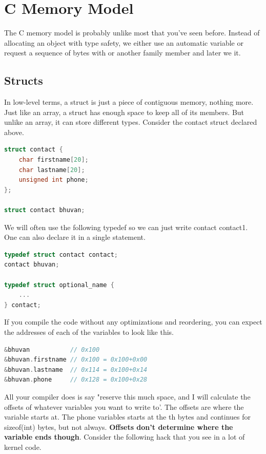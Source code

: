 \section{C Memory Model}

The C memory model is probably unlike most that you've seen before. Instead of allocating an object with type safety, we either use an automatic variable or request a sequence of bytes with  or another family member and later we  it.

\subsection{Structs}

In low-level terms, a struct is just a piece of contiguous memory, nothing more.
Just like an array, a struct has enough space to keep all of its members.
But unlike an array, it can store different types. Consider the contact struct declared above.

\begin{lstlisting}[language=C]
struct contact {
    char firstname[20];
    char lastname[20];
    unsigned int phone;
};

struct contact bhuvan;
\end{lstlisting}

We will often use the following typedef so we can just write contact contact1. One can also declare it in a single statement. 
\begin{lstlisting}[language=C]
typedef struct contact contact;
contact bhuvan;

typedef struct optional_name {
    ...
} contact;
\end{lstlisting}

If you compile the code without any optimizations and reordering, you can expect the addresses of each of the variables to look like this.

\begin{lstlisting}[language=C]
&bhuvan           // 0x100
&bhuvan.firstname // 0x100 = 0x100+0x00
&bhuvan.lastname  // 0x114 = 0x100+0x14
&bhuvan.phone     // 0x128 = 0x100+0x28
\end{lstlisting}

All your compiler does is say "reserve this much space, and I will calculate the offsets of whatever variables you want to write to'.
The offsets are where the variable starts at.
The phone variables starts at the th bytes and continues for sizeof(int) bytes, but not always.
\textbf{Offsets don't determine where the variable ends though}. Consider the following hack that you see in a lot of kernel code.

